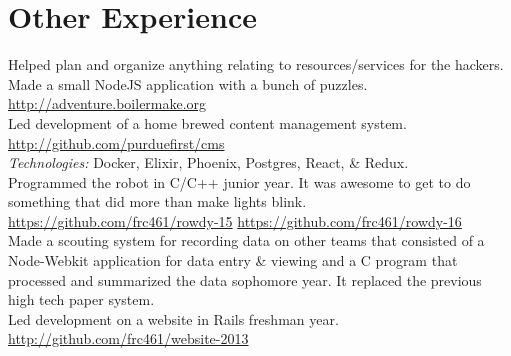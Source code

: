 \documentclass[11pt,letter,sans]{moderncv}
\begin{document}
\section{Other Experience}
Helped plan and organize anything relating to resources/services for the hackers.
Made a small NodeJS application with a bunch of puzzles. \url{http://adventure.boilermake.org}
\\
Led development of a home brewed content management system. \url{http://github.com/purduefirst/cms}
\\
\textit{Technologies:} Docker, Elixir, Phoenix, Postgres, React, \& Redux.
\\
Programmed the robot in C/C++ junior year.
It was awesome to get to do something that did more than make lights blink.
\url{https://github.com/frc461/rowdy-15} \url{https://github.com/frc461/rowdy-16}
\\
Made a scouting system for recording data on other teams that consisted of a Node-Webkit application for data entry \& viewing and a C program that processed and summarized the data sophomore year.
It replaced the previous high tech paper system.
\\
Led development on a website in Rails freshman year. \url{http://github.com/frc461/website-2013}
\\
\end{document}
